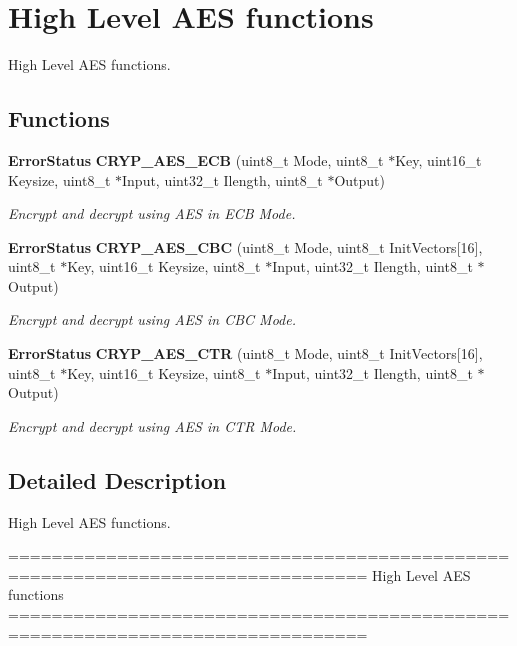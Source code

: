 \section{High Level A\+ES functions}
\label{group__CRYP__Group6}


High Level A\+ES functions.  


\subsection*{Functions}
\begin{DoxyCompactItemize}
\item 
\textbf{ Error\+Status} \textbf{ C\+R\+Y\+P\+\_\+\+A\+E\+S\+\_\+\+E\+CB} (uint8\+\_\+t Mode, uint8\+\_\+t $\ast$Key, uint16\+\_\+t Keysize, uint8\+\_\+t $\ast$Input, uint32\+\_\+t Ilength, uint8\+\_\+t $\ast$Output)
\begin{DoxyCompactList}\small\item\em Encrypt and decrypt using A\+ES in E\+CB Mode. \end{DoxyCompactList}\item 
\textbf{ Error\+Status} \textbf{ C\+R\+Y\+P\+\_\+\+A\+E\+S\+\_\+\+C\+BC} (uint8\+\_\+t Mode, uint8\+\_\+t Init\+Vectors[16], uint8\+\_\+t $\ast$Key, uint16\+\_\+t Keysize, uint8\+\_\+t $\ast$Input, uint32\+\_\+t Ilength, uint8\+\_\+t $\ast$Output)
\begin{DoxyCompactList}\small\item\em Encrypt and decrypt using A\+ES in C\+BC Mode. \end{DoxyCompactList}\item 
\textbf{ Error\+Status} \textbf{ C\+R\+Y\+P\+\_\+\+A\+E\+S\+\_\+\+C\+TR} (uint8\+\_\+t Mode, uint8\+\_\+t Init\+Vectors[16], uint8\+\_\+t $\ast$Key, uint16\+\_\+t Keysize, uint8\+\_\+t $\ast$Input, uint32\+\_\+t Ilength, uint8\+\_\+t $\ast$Output)
\begin{DoxyCompactList}\small\item\em Encrypt and decrypt using A\+ES in C\+TR Mode. \end{DoxyCompactList}\end{DoxyCompactItemize}


\subsection{Detailed Description}
High Level A\+ES functions. 

\begin{DoxyVerb} ===============================================================================
                          High Level AES functions
 ===============================================================================\end{DoxyVerb}
 

